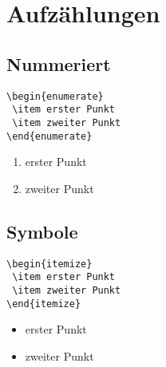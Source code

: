 \section{Aufzählungen}

\subsection{Nummeriert}
\begin{lstlisting}
\begin{enumerate}
 \item erster Punkt
 \item zweiter Punkt
\end{enumerate}
\end{lstlisting}

\begin{enumerate}
 \item erster Punkt
 \item zweiter Punkt
\end{enumerate}

\subsection{Symbole}
\begin{lstlisting}
\begin{itemize}
 \item erster Punkt
 \item zweiter Punkt
\end{itemize}
\end{lstlisting}

\begin{itemize}
 \item erster Punkt
 \item zweiter Punkt
\end{itemize}

